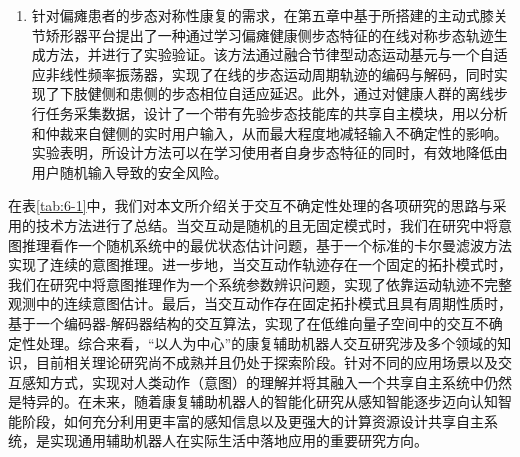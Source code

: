\begin{enumerate}
\item 针对偏瘫患者的步态对称性康复的需求，在第五章中基于所搭建的主动式膝关节矫形器平台提出了一种通过学习偏瘫健康侧步态特征的在线对称步态轨迹生成方法，并进行了实验验证。该方法通过融合节律型动态运动基元与一个自适应非线性频率振荡器，实现了在线的步态运动周期轨迹的编码与解码，同时实现了下肢健侧和患侧的步态相位自适应延迟。此外，通过对健康人群的离线步行任务采集数据，设计了一个带有先验步态技能库的共享自主模块，用以分析和仲裁来自健侧的实时用户输入，从而最大程度地减轻输入不确定性的影响。实验表明，所设计方法可以在学习使用者自身步态特征的同时，有效地降低由用户随机输入导致的安全风险。
\end{enumerate}

在表\ref{tab:6-1}中，我们对本文所介绍关于交互不确定性处理的各项研究的思路与采用的技术方法进行了总结。当交互动是随机的且无固定模式时，我们在研究中将意图推理看作一个随机系统中的最优状态估计问题，基于一个标准的卡尔曼滤波方法实现了连续的意图推理。进一步地，当交互动作轨迹存在一个固定的拓扑模式时，我们在研究中将意图推理作为一个系统参数辨识问题，实现了依靠运动轨迹不完整观测中的连续意图估计。最后，当交互动作存在固定拓扑模式且具有周期性质时，基于一个编码器-解码器结构的交互算法，实现了在低维向量子空间中的交互不确定性处理。综合来看，``以人为中心''的康复辅助机器人交互研究涉及多个领域的知识，目前相关理论研究尚不成熟并且仍处于探索阶段。针对不同的应用场景以及交互感知方式，实现对人类动作（意图）的理解并将其融入一个共享自主系统中仍然是特异的。在未来，随着康复辅助机器人的智能化研究从感知智能逐步迈向认知智能阶段，如何充分利用更丰富的感知信息以及更强大的计算资源设计共享自主系统，是实现通用辅助机器人在实际生活中落地应用的重要研究方向。